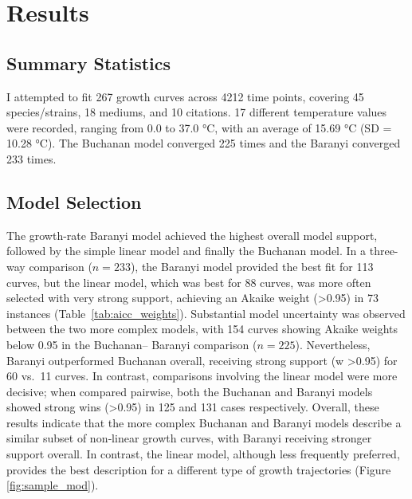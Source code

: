 \documentclass[11pt]{article}
\begin{document}
\section{Results}

\subsection{Summary Statistics}
I attempted to fit 267 growth curves across 4212 time points, covering 45 species/strains, 18 
mediums, and 10 citations. 17 different temperature values were recorded, ranging from 0.0 
to 37.0 °C, with an average of 15.69 °C (SD = 10.28 °C). The Buchanan model converged 225 
times and the Baranyi converged 233 times.
\subsection{Model Selection}


The growth-rate Baranyi model achieved the highest overall model support, followed by the 
simple linear model and finally the Buchanan model. In a three-way comparison ($n = 233$), 
the Baranyi model provided the best fit for 113 curves, but the linear model, which was best 
for 88 curves, was more often selected with very strong support, achieving an Akaike weight 
(\textgreater 0.95) in 73 instances (Table~\ref{tab:aicc_weights}). 
Substantial model uncertainty was observed between 
the two more complex models, with 154 curves showing Akaike weights below 0.95 in the Buchanan–
Baranyi comparison ($n = 225$). Nevertheless, Baranyi outperformed Buchanan overall, 
receiving strong support (w \textgreater 0.95) for 60 vs.\ 11 curves. In contrast, 
comparisons involving the linear model were more decisive; when compared pairwise, both the 
Buchanan and Baranyi models showed strong wins (\textgreater 0.95) in 125 and 131 cases 
respectively. Overall, these results indicate that the more complex Buchanan and Baranyi 
models describe a similar subset of non‑linear growth curves, with Baranyi receiving 
stronger support overall. In contrast, the linear model, although less frequently preferred, 
provides the best description for a different type of growth trajectories (Figure \ref{fig:sample_mod}). 
\end{document}

